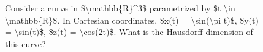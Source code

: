 \begin{figure}[t]
\centering
\setlength{\columnsep}{12pt}
\setlength{\colw}{\dimexpr(\linewidth-2\columnsep)/3\relax}
\begin{promptrow}
\caret{}\par\vspace{4pt}
Consider a curve in \$\textbackslash{}mathbb\{R\}\textasciicircum{}3\$ parametrized by \$t \textbackslash{}in \textbackslash{}mathbb\{R\}\$. In Cartesian coordinates, \$x(t) = \textbackslash{}sin(\textbackslash{}pi t)\$, \$y(t) = \textbackslash{}sin(t)\$, \$z(t) = \textbackslash{}cos(2t)\$. What is the Hausdorff dimension of this curve?
\par\vspace{6pt}
{}\par\vspace{3pt}
{\monofont\footnotesize {}}
\end{promptrow}

\vspace{12pt}


\end{figure}
